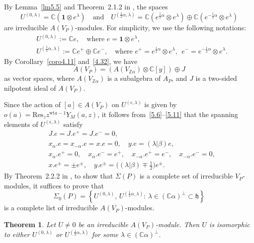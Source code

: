 \documentclass[12pt,a4paper,reqno]{amsart}
\numberwithin{equation}{section}
\numberwithin{equation}{section}
\newtheorem{thm}{Theorem}[section]
\theoremstyle{definition}
\newcommand{\Z}{\mathbb{Z}}
\def \C {\mathbb{C}}
\def\la{\lambda}
\def \al{\alpha}
\def \b {\beta}
\def \op {\oplus}
\def \vac {\mathbf{1}}
\def \h {\mathfrak{h}}
\def\Res{\mathrm{Res}}
\def \wt {\mathrm{wt}}
\def\o{\otimes}
\begin{document}
	By Lemma~\ref{lm5.5} and Theorem~2.1.2 in \cite{Z}, the spaces 
	\[
	U^{(0,\la)}=\C (\vac\o e^\la)
	\quad\text{and}\quad
	U^{(\frac{1}{2}\al,\la)}
	=\C (e^{\frac{1}{2}\al}\o e^\la)\op \C (e^{-\frac{1}{2}\al}\o e^\la)
	\]
	are irreducible $A(V_P)$-modules.  
	For simplicity, we use the following notations:
	\begin{align}
		&U^{(0,\la)}:=\C e,\quad\text{where } e=\vac\o e^\la, \label{eq:U0la}\\
		&U^{(\frac{1}{2}\al,\la)}:=\C e^+\op\C e^-,\quad\text{where } 
		e^+=e^{\frac{1}{2}\al}\o e^\la,\ \ e^-=e^{-\frac{1}{2}\al}\o e^\la. \label{eq:U1/2alla}
	\end{align}
	By Corollary~\ref{coro4.11} and~\eqref{4.32}, we have 
	\[
	A(V_P)=(A(V_{\Z\al})\o \C[y])\op J
	\]
	as vector spaces, where $A(V_{\Z\al})$ is a subalgebra of $A_P$, and $J$ is a two-sided nilpotent ideal of $A(V_P)$. 
	
	Since the action of $[a]\in A(V_P)$ on $U^{(\epsilon,\la)}$ is given by 
	$o(a)=\Res_z z^{\wt a-1}Y_M(a,z)$, it follows from~\eqref{5.6}--\eqref{5.11} that the spanning elements of $U^{(\epsilon,\la)}$ satisfy
	\begin{align}
		&J.e=J.e^+=J.e^-=0,\label{5.20}\\
		&x_\al.e=x_{-\al}.e=x.e=0,\quad y.e=(\la|\b)e,\label{5.21}\\
		&x_\al.e^+=0,\quad x_\al.e^-=e^+,\quad
		x_{-\al}.e^+=e^-,\quad x_{-\al}.e^-=0,\nonumber\\
		&x.e^{\pm}=\pm e^{\pm},\quad 
		y.e^{\pm}=\big((\la|\b)\mp\tfrac{1}{2}\big)e^{\pm}. \label{5.22}
	\end{align}
	By Theorem~2.2.2 in \cite{Z}, to show that $\Sigma(P)$ is a complete set of irreducible $V_P$-modules, it suffices to prove that
	\begin{equation}\label{5.23}
		\Sigma_0(P)
		=\left\{ U^{(0,\la)},\, U^{(\frac{1}{2}\al,\la)} 
		:\, \la\in (\C\al)^\perp\subset \h \right\}
	\end{equation}
	is a complete list of irreducible $A(V_P)$-modules.
	
	\begin{thm}\label{thm5.6}
		Let $U\neq 0$ be an irreducible $A(V_P)$-module. Then $U$ is isomorphic to either 
		$U^{(0,\la)}$ or $U^{(\frac{1}{2}\al,\la)}$ for some $\la\in (\C\al)^\perp$.
	\end{thm}
	
\end{document}
